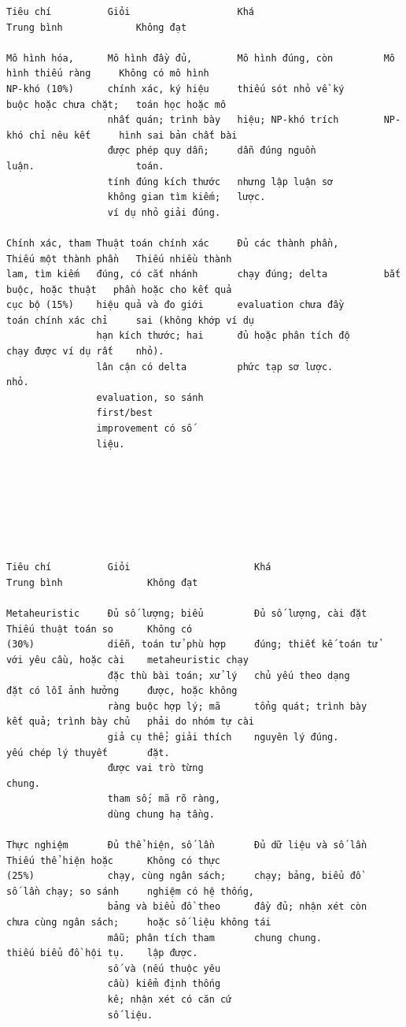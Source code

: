 \documentclass[a4paper,11pt]{article}
\begin{document}
\begin{Verbatim}[fontsize=\tiny,breaklines=true,breakanywhere=true]
Tiêu chí          Giỏi                   Khá                       Trung bình             Không đạt

Mô hình hóa,      Mô hình đầy đủ,        Mô hình đúng, còn         Mô hình thiếu ràng     Không có mô hình
NP-khó (10%)      chính xác, ký hiệu     thiếu sót nhỏ về ký       buộc hoặc chưa chặt;   toán học hoặc mô
                  nhất quán; trình bày   hiệu; NP-khó trích        NP-khó chỉ nêu kết     hình sai bản chất bài
                  được phép quy dẫn;     dẫn đúng nguồn            luận.                  toán.
                  tính đúng kích thước   nhưng lập luận sơ
                  không gian tìm kiếm;   lược.
                  ví dụ nhỏ giải đúng.

Chính xác, tham Thuật toán chính xác     Đủ các thành phần,        Thiếu một thành phần   Thiếu nhiều thành
lam, tìm kiếm   đúng, có cắt nhánh       chạy đúng; delta          bắt buộc, hoặc thuật   phần hoặc cho kết quả
cục bộ (15%)    hiệu quả và đo giới      evaluation chưa đầy       toán chính xác chỉ     sai (không khớp ví dụ
                hạn kích thước; hai      đủ hoặc phân tích độ      chạy được ví dụ rất    nhỏ).
                lân cận có delta         phức tạp sơ lược.         nhỏ.
                evaluation, so sánh
                first/best
                improvement có số
                liệu.







Tiêu chí          Giỏi                      Khá                      Trung bình               Không đạt

Metaheuristic     Đủ số lượng; biểu         Đủ số lượng, cài đặt     Thiếu thuật toán so      Không có
(30%)             diễn, toán tử phù hợp     đúng; thiết kế toán tử   với yêu cầu, hoặc cài    metaheuristic chạy
                  đặc thù bài toán; xử lý   chủ yếu theo dạng        đặt có lỗi ảnh hưởng     được, hoặc không
                  ràng buộc hợp lý; mã      tổng quát; trình bày     kết quả; trình bày chủ   phải do nhóm tự cài
                  giả cụ thể; giải thích    nguyên lý đúng.          yếu chép lý thuyết       đặt.
                  được vai trò từng                                  chung.
                  tham số; mã rõ ràng,
                  dùng chung hạ tầng.

Thực nghiệm       Đủ thể hiện, số lần       Đủ dữ liệu và số lần     Thiếu thể hiện hoặc      Không có thực
(25%)             chạy, cùng ngân sách;     chạy; bảng, biểu đồ      số lần chạy; so sánh     nghiệm có hệ thống,
                  bảng và biểu đồ theo      đầy đủ; nhận xét còn     chưa cùng ngân sách;     hoặc số liệu không tái
                  mẫu; phân tích tham       chung chung.             thiếu biểu đồ hội tụ.    lập được.
                  số và (nếu thuộc yêu
                  cầu) kiểm định thống
                  kê; nhận xét có căn cứ
                  số liệu.


\end{Verbatim}
\end{document}
